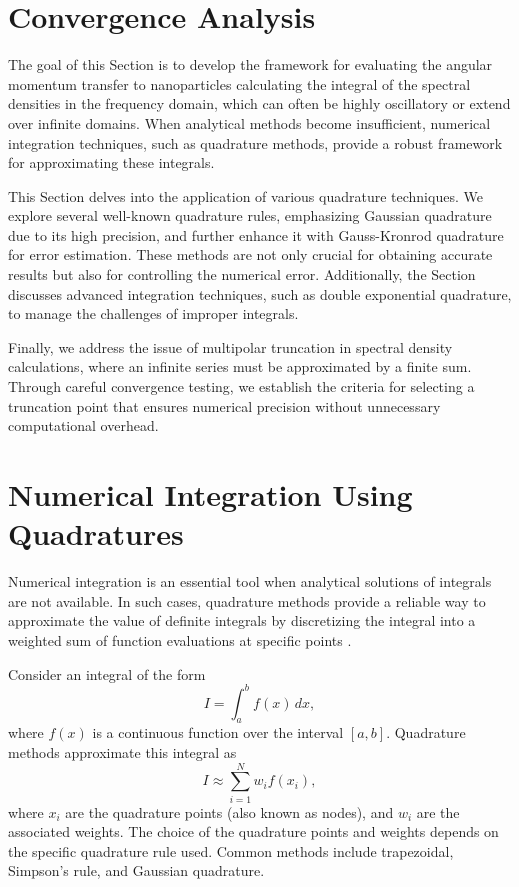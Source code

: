 \label{cap: resultados computacionales}


\section{Convergence Analysis}

The goal of this Section is to develop the framework for evaluating the angular momentum transfer to nanoparticles calculating the integral of the spectral densities in the frequency domain, which can often be highly oscillatory or extend over infinite domains. When analytical methods become insufficient, numerical integration techniques, such as quadrature methods, provide a robust framework for approximating these integrals.

This Section delves into the application of various quadrature techniques. We explore several well-known quadrature rules, emphasizing Gaussian quadrature due to its high precision, and further enhance it with Gauss-Kronrod quadrature for error estimation. These methods are not only crucial for obtaining accurate results but also for controlling the numerical error. Additionally, the Section discusses advanced integration techniques, such as double exponential quadrature, to manage the challenges of improper integrals. 

Finally, we address the issue of multipolar truncation in spectral density calculations, where an infinite series must be approximated by a finite sum. Through careful convergence testing, we establish the criteria for selecting a truncation point that ensures numerical precision without unnecessary computational overhead. 

\section{Numerical Integration Using Quadratures}

Numerical integration is an essential tool when analytical solutions of integrals are not available. In such cases, quadrature methods provide a reliable way to approximate the value of definite integrals by discretizing the integral into a weighted sum of function evaluations at specific points \cite{kahaner1989numerical, hildebrand1987numeric, press2007numerical}.

Consider an integral of the form
\begin{equation}
    I = \int_{a}^{b} f(x)\, dx,
\end{equation}
where $f(x)$ is a continuous function over the interval $[a, b]$. Quadrature methods approximate this integral as
\begin{equation}
    I \approx \sum_{i=1}^{N} w_i f(x_i), \label{eq: quadrature as a sum}
\end{equation}
where $x_i$ are the quadrature points (also known as nodes), and $w_i$ are the associated weights. The choice of the quadrature points and weights depends on the specific quadrature rule used. Common methods include trapezoidal, Simpson’s rule, and Gaussian quadrature.

